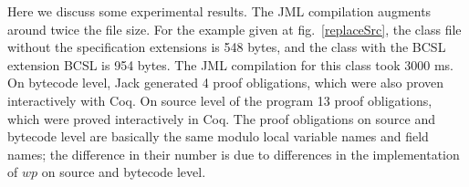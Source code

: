 
Here we discuss some experimental results. 
The JML compilation augments around twice the file size. 
For the example given at fig.~\ref{replaceSrc}, the class file without the specification extensions is 548 bytes, 
and the class with the BCSL extension BCSL is 954 bytes. The JML compilation for this class took 3000 ms. On bytecode level, Jack generated 4 proof obligations,  
which were also proven interactively with Coq. On source level of the program 13 proof obligations, 
which were proved interactively in Coq. The proof obligations on source and bytecode level are basically the same modulo 
 local variable names and field names; the difference in their number is due to differences in the implementation of $wp$ on source and bytecode level. 
